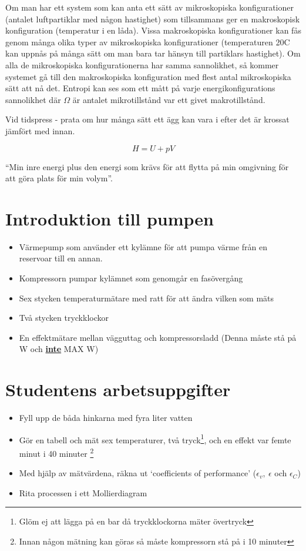 \documentclass[11pt]{article}
\begin{document}
Om man har ett system som kan anta ett sätt av mikroskopiska konfigurationer (antalet luftpartiklar med någon hastighet) som tillsammans ger en makroskopisk konfiguration (temperatur i en låda). Vissa makroskopiska konfigurationer kan fås genom många olika typer av mikroskopiska konfigurationer (temperaturen 20\degree C kan uppnås på många sätt om man bara tar hänsyn till partiklars hastighet). Om alla de mikroskopiska konfigurationerna har samma sannolikhet, så kommer systemet gå till den makroskopiska konfiguration med flest antal mikroskopiska sätt att nå det. Entropi kan ses som ett mått på varje energikonfigurations sannolikhet där $\Omega$ är antalet mikrotillstånd var ett givet makrotillstånd.

Vid tidspress - prata om hur många sätt ett ägg kan vara i efter det är krossat jämfört med innan.

\begin{equation}
    H = U + pV
\end{equation}

``Min inre energi plus den energi som krävs för att flytta på min omgivning för att göra plats för min volym''.

\section{Introduktion till pumpen}

\begin{itemize}
    \item Värmepump som använder ett kylämne för att pumpa värme från en reservoar till en annan.
    \item Kompressorn pumpar kylämnet som genomgår en fasövergång
    \item Sex stycken temperaturmätare med ratt för att ändra vilken som mäts
    \item Två stycken tryckklockor 
    \item En effektmätare mellan vägguttag och kompressorsladd (Denna måste stå på W och \underline{\textbf{inte}} MAX W)
\end{itemize}

\section{Studentens arbetsuppgifter}

\begin{itemize}
    \item Fyll upp de båda hinkarna med fyra liter vatten
    \item Gör en tabell och mät sex temperaturer, två tryck\footnote{Glöm ej att lägga på en bar då tryckklockorna mäter övertryck}, och en effekt var femte minut i 40 minuter \footnote{Innan någon mätning kan göras så måste kompressorn stå på i 10 minuter}
    \item Med hjälp av mätvärdena, räkna ut `coefficients of performance' ($\epsilon_v, \ \epsilon$ och $\epsilon_C$)
    \item Rita processen i ett Mollierdiagram
\end{itemize}
\end{document}
